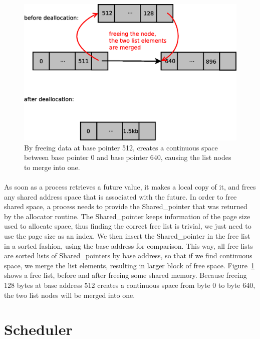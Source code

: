 \begin{figure}[!ht]
\includegraphics[width=0.7\columnwidth]{figures/free}
\caption{By freeing data at base pointer 512, creates a continuous space between base pointer 0 and
base pointer 640, causing the list nodes to merge into one.}
\label{fig:free}
\end{figure}

\paragraph{}
As soon as a process retrieves a future value, it makes a local copy of it, and frees any shared address space
that is associated with the future.  In order to free shared space, a process needs to provide the Shared\_pointer
that was returned by the allocator routine.  The Shared\_pointer keeps information of the page size used to 
allocate space, thus finding the correct free list is trivial, we just need to use the page size as an index.
We then insert the Shared\_pointer in the free list in a sorted fashion, using the base address for comparison.
This way, all free lists are sorted lists of Shared\_pointers by base address, so that if we find continuous
space, we merge the list elements, resulting in larger block of free space.  Figure~\ref{fig:free} shows a 
free list, before and after freeing some shared memory.  Because freeing 128 bytes at base address 512 creates
a continuous space from byte 0 to byte 640, the two list nodes will be merged into one.

\section{Scheduler}
\label{sect:scheduler}

